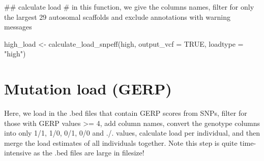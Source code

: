 \documentclass[
  letterpaper,
  DIV=11,
  numbers=noendperiod]{scrreprt}
\newenvironment{Shaded}{}{}
\newcommand{\AttributeTok}[1]{\textcolor[rgb]{0.84,0.23,0.29}{#1}}
\newcommand{\CommentTok}[1]{\textcolor[rgb]{0.42,0.45,0.49}{#1}}
\newcommand{\ConstantTok}[1]{\textcolor[rgb]{0.00,0.36,0.77}{#1}}
\newcommand{\DocumentationTok}[1]{\textcolor[rgb]{0.42,0.45,0.49}{#1}}
\newcommand{\FunctionTok}[1]{\textcolor[rgb]{0.44,0.26,0.76}{#1}}
\newcommand{\NormalTok}[1]{\textcolor[rgb]{0.14,0.16,0.18}{#1}}
\newcommand{\OtherTok}[1]{\textcolor[rgb]{0.44,0.26,0.76}{#1}}
\newcommand{\StringTok}[1]{\textcolor[rgb]{0.01,0.18,0.38}{#1}}
\begin{document}
\begin{Shaded}
\begin{Highlighting}[]
\DocumentationTok{\#\# calculate load }
\CommentTok{\# in this function, we give the columns names, filter for only the largest 29 autosomal scaffolds and exclude annotations with warning messages}

\NormalTok{high\_load }\OtherTok{\textless{}{-}} \FunctionTok{calculate\_load\_snpeff}\NormalTok{(high, }\AttributeTok{output\_vcf =} \ConstantTok{TRUE}\NormalTok{, }\AttributeTok{loadtype =} \StringTok{"high"}\NormalTok{)}
\end{Highlighting}
\end{Shaded}

\section{Mutation load (GERP)}\label{mutation-load-gerp}

Here, we load in the .bed files that contain GERP scores from SNPs,
filter for those with GERP values \textgreater= 4, add column names,
convert the genotype columns into only 1/1, 1/0, 0/1, 0/0 and ./.
values, calculate load per individual, and then merge the load estimates
of all individuals together. Note this step is quite time-intensive as
the .bed files are large in filesize!
\end{document}
